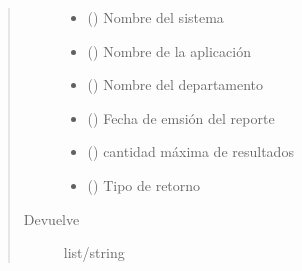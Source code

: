 \documentclass[a4paper,12pt,spanish]{sphinxmanual}
\begin{document}
\begin{fulllineitems}
\begin{fulllineitems}
\begin{quote}
\begin{description}
\begin{itemize}
\item {} 
 () \textendash{} Nombre del sistema

\item {} 
 () \textendash{} Nombre de la aplicación

\item {} 
 () \textendash{} Nombre del departamento

\item {} 
 () \textendash{} Fecha de emsión del reporte

\item {} 
 () \textendash{} cantidad máxima de resultados

\item {} 
 () \textendash{} Tipo de retorno

\end{itemize}

\item[{Devuelve}] \leavevmode
list/string


\end{description}
\end{quote}
\end{fulllineitems}
\end{fulllineitems}
\end{document}
